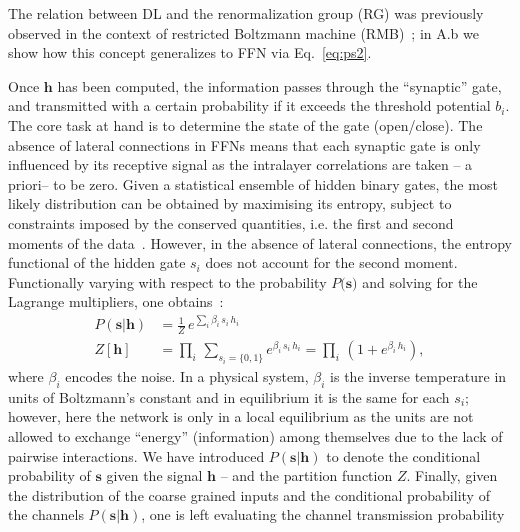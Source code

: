 \documentclass{article}
\begin{document}
%
The relation between  DL and the renormalization group (RG) was previously observed in the context of restricted Boltzmann machine (RMB)~\cite{mehta}; in A.b we show how this concept generalizes to FFN via Eq.~\eqref{eq:ps2}.

Once $\mathbf{h}$ has been computed, the information passes through the ``synaptic'' gate, and transmitted with a certain probability if it exceeds the threshold potential $b_i$. The core task at hand is to determine the state of the gate (open/close). The absence of lateral connections in FFNs means that each synaptic gate is only influenced by its receptive signal as the intralayer correlations are taken -- a priori-- to be zero. Given a statistical ensemble of hidden binary gates, the most likely distribution  can be obtained by maximising its entropy, subject to constraints imposed by the conserved quantities, i.e. the first and second moments of the data~\cite{zecchina, mckay}. However, in the absence of lateral connections, the entropy functional of the hidden gate $s_i$ does not account for the second moment.
%
%
Functionally varying with respect to the probability $P(\mathbf{s)}$ and solving for the Lagrange multipliers, one  obtains~\cite{roberto}:
%
\begin{align} \label{eq:entropy4}
P(\mathbf{s} | \mathbf{h}) &= \frac{1}{Z} \, e^{ \sum_i \beta_i  \, s_i \, h_i } \\ \nonumber
Z[\mathbf{h}] &= \prod_i \, \sum_{s_i = \{ 0,1\} } e^{\beta_i \, s_i \, h_i}  =\prod_i \, \left( 1+ e^{\beta_i \, h_i} \right),
\end{align}
%
where $\beta_i$ encodes the noise.  In a physical system, $\beta_i$ is the inverse temperature in units of Boltzmann's constant and in equilibrium it is the same for each $s_i$; however, here the network is only in a local equilibrium as the units are not allowed to exchange ``energy'' (information) among themselves due to the lack of pairwise interactions. We have introduced $P(\mathbf{s} | \mathbf{h})$ to denote the conditional probability of $\mathbf{s}$ given the signal $\mathbf{h}$ --  and the partition function $Z$. Finally, given the distribution of the coarse grained inputs and the conditional probability of the channels $P(\mathbf{s}|\mathbf{h})$, one is left evaluating the channel transmission probability
\end{document}
